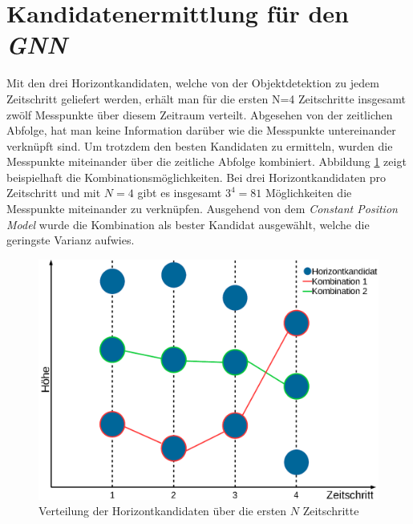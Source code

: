 \documentclass[10pt,a4paper]{article}
\begin{document}
\section{Kandidatenermittlung für den \textit{GNN}}
	Mit den drei Horizontkandidaten, welche von der Objektdetektion zu jedem Zeitschritt geliefert werden, erhält man für die ersten N=4 Zeitschritte insgesamt zwölf Messpunkte über diesem Zeitraum verteilt. Abgesehen von der zeitlichen Abfolge, hat man keine Information darüber wie die Messpunkte untereinander verknüpft sind. Um trotzdem den besten Kandidaten zu ermitteln, wurden die Messpunkte miteinander über die zeitliche Abfolge kombiniert. Abbildung \ref{fig: Verteilung der Horizontkandidaten ueber die ersten N Zeitschritte} zeigt beispielhaft die Kombinationsmöglichkeiten. Bei drei Horizontkandidaten pro Zeitschritt und mit $N=4$ gibt es insgesamt $3^4=81$ Möglichkeiten die Messpunkte miteinander zu verknüpfen. Ausgehend von dem \textit{Constant Position Model} wurde die Kombination als bester Kandidat ausgewählt, welche die geringste Varianz aufwies.
	\begin{figure}[h]
		\centering
		\includegraphics[width=.6\linewidth]{./Pictures_report/Verteilung der Horizontkandidaten ueber die ersten N Zeitschritte.png}
		\caption{Verteilung der  Horizontkandidaten über die ersten $N$ Zeitschritte}
		\label{fig: Verteilung der Horizontkandidaten ueber die ersten N Zeitschritte}
	\end{figure} 
\end{document}
